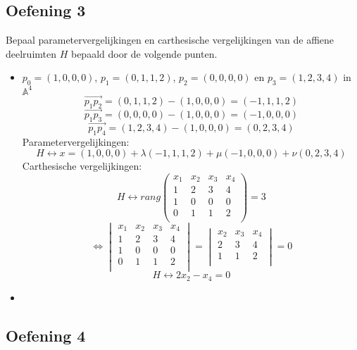 \documentclass[main.tex]{subfiles}
\begin{document}
\subsection*{Oefening 3}
Bepaal parametervergelijkingen en carthesische vergelijkingen van de affiene deelruimten $H$ bepaald door de volgende punten.
\begin{itemize}
\item $p_{0} = (1,0,0,0)$, $p_{1} = (0,1,1,2)$, $p_{2} = (0,0,0,0)$ en $p_{3} = (1,2,3,4)$ in $\mathbb{A}^{4}$\\
  \[ \overrightarrow{p_{1}p_{2}} = (0,1,1,2) - (1,0,0,0) = (-1,1,1,2) \]
  \[ \overrightarrow{p_{1}p_{3}} = (0,0,0,0) - (1,0,0,0) = (-1,0,0,0) \]
  \[ \overrightarrow{p_{1}p_{4}} = (1,2,3,4) - (1,0,0,0) = (0,2,3,4) \]
  Parametervergelijkingen:
  \[ H \leftrightarrow x = (1,0,0,0) + \lambda(-1,1,1,2) + \mu(-1,0,0,0) + \nu(0,2,3,4) \]
  Carthesische vergelijkingen:
  \[
  H \leftrightarrow
  rang
  \begin{pmatrix}
    x_{1} & x_{2} & x_{3} & x_{4}\\
    1 & 2 & 3 & 4\\
    1 & 0 & 0 & 0\\
    0 & 1 & 1 & 2\\
  \end{pmatrix}
  = 3
  \]
  \[
  \Leftrightarrow
  \begin{vmatrix}
    x_{1} & x_{2} & x_{3} & x_{4}\\
    1 & 2 & 3 & 4\\
    1 & 0 & 0 & 0\\
    0 & 1 & 1 & 2\\
  \end{vmatrix}
  = 
  \begin{vmatrix}
    x_{2} & x_{3} & x_{4}\\
    2 & 3 & 4\\
    1 & 1 & 2\\
  \end{vmatrix}
  = 0
  \]
  \[
  H \leftrightarrow 2x_{2} - x_{4} = 0
  \]
\item 
\end{itemize}

\subsection*{Oefening 4}
\end{document}
